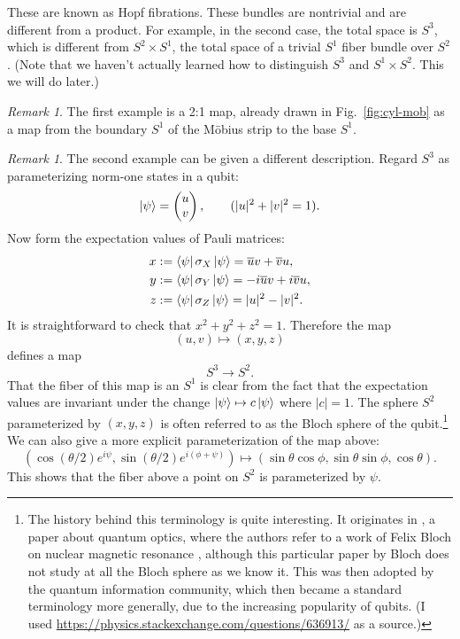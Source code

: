 \documentclass[12pt]{article}
\numberwithin{equation}{section}
\theoremstyle{remark}
\newtheorem{remark}[definition]{Remark}
\let\bar\overline
\begin{document}
These are known as Hopf fibrations.
These bundles are nontrivial
and are different from a product.
For example, in the second case,
the total space is $S^3$,
which is different from $S^2\times S^1$,
the total space of a trivial $S^1$ fiber bundle over $S^2$.
(Note that we haven't actually learned how to distinguish
$S^3$ and $S^1\times S^2$.
This we will do later.)

\begin{remark}
The first example is a 2:1 map,
already drawn in Fig.~\ref{fig:cyl-mob} 
as a map from the boundary $S^1$ of the M\"obius strip to the base $S^1$.
\end{remark}
\begin{remark}
The second example can be given a different description. 
Regard $S^3$ as parameterizing norm-one states
in a qubit:
\begin{equation}
  \ket{\psi}=\begin{pmatrix}u \\v \end{pmatrix},
  \qquad (|u|^2+|v|^2=1).
\end{equation}
Now form the expectation values of Pauli matrices:
\begin{align}
  x &:= \bra{\psi} \sigma_X \ket{\psi} = \bar u v + \bar v u, \\
  y &:= \bra{\psi} \sigma_Y \ket{\psi} = -i\bar u v +i \bar v u, \\
  z &:= \bra{\psi} \sigma_Z \ket{\psi} = |u|^2 - |v|^2.
\end{align}
It is straightforward to check that $x^2+y^2+z^2=1$.
Therefore the map \begin{equation}
(u,v)\mapsto (x,y,z)
\label{eq:uvXYZ}
\end{equation} defines a map \begin{equation}
  S^3\to S^2.
\end{equation}
That the fiber of this map is an $S^1$ is clear from the fact
that the expectation values are invariant under the change
$\ket{\psi}\mapsto c\ket{\psi}$ where $|c|=1$.
The sphere $S^2$ parameterized by $(x,y,z)$ is often referred to as the Bloch sphere of the qubit.\footnote{%
The history behind this terminology is quite interesting.
It originates in \cite{ACGT}, a paper about quantum optics,
where the authors refer to a work of Felix Bloch on nuclear magnetic resonance \cite{Bloch}, 
although this particular paper by Bloch does not study at all the Bloch sphere as we know it.
This was then adopted by the quantum information community,
which then became a standard terminology more generally, due to the increasing popularity of qubits. 
(I used \url{https://physics.stackexchange.com/questions/636913/} as a source.)
}
We can also give a more explicit parameterization of the map above:
\begin{equation}
  \label{eq:Hopf-explicit}
(\cos(\theta/2)  e^{i \psi},
\sin(\theta/2) e^{i(\phi+\psi)} )
\mapsto  (\sin\theta\cos\phi,\sin\theta\sin\phi,\cos\theta).
\end{equation}
This shows that the fiber above a point on $S^2$ is parameterized by $\psi$.


\end{remark}
\end{document}
